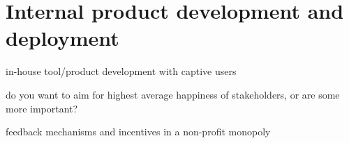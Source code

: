 \section{Internal product development and deployment\label{sec:internal_product}}


in-house tool/product development with captive users

do you want to aim for highest average happiness of stakeholders, or are some more important?

feedback mechanisms and incentives in a non-profit monopoly
